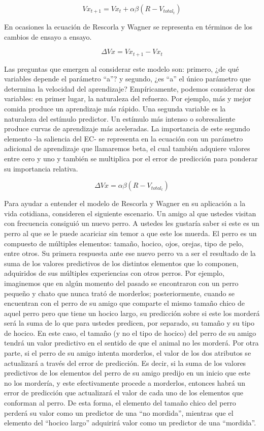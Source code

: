 \documentclass[
  letterpaper,
]{book}
\begin{document}
\[
Vx_{t+1} = Vx_t + \alpha \beta(R-V_{total_t})
\]

En ocasiones la ecuación de Rescorla y Wagner se representa en términos
de los cambios de ensayo a ensayo.

\[
\Delta Vx =Vx_{t+1} - Vx_t
\]

Las preguntas que emergen al considerar este modelo son: primero, ¿de
qué variables depende el parámetro ``a''? y segundo, ¿es ``a'' el único
parámetro que determina la velocidad del aprendizaje? Empíricamente,
podemos considerar dos variables: en primer lugar, la naturaleza del
refuerzo. Por ejemplo, más y mejor comida produce un aprendizaje más
rápido. Una segunda variable es la naturaleza del estímulo predictor. Un
estímulo más intenso o sobresaliente produce curvas de aprendizaje más
aceleradas. La importancia de este segundo elemento -la saliencia del
EC- se representa en la ecuación con un parámetro adicional de
aprendizaje que llamaremos beta, el cual también adquiere valores entre
cero y uno y también se multiplica por el error de predicción para
ponderar su importancia relativa.

\[
\Delta Vx = \alpha \beta (R-V_{total_t})
\]

Para ayudar a entender el modelo de Rescorla y Wagner en su aplicación a
la vida cotidiana, consideren el siguiente escenario. Un amigo al que
ustedes visitan con frecuencia consiguió un nuevo perro. A ustedes les
gustaría saber si este es un perro al que se le puede acariciar sin
temor a que este los muerda. El perro es un compuesto de múltiples
elementos: tamaño, hocico, ojos, orejas, tipo de pelo, entre otros. Su
primera respuesta ante ese nuevo perro va a ser el resultado de la suma
de los valores predictivos de los distintos elementos que lo componen,
adquiridos de sus múltiples experiencias con otros perros. Por ejemplo,
imaginemos que en algún momento del pasado se encontraron con un perro
pequeño y chato que nunca trató de morderlos; posteriormente, cuando se
encuentran con el perro de su amigo que comparte el mismo tamaño chico
de aquel perro pero que tiene un hocico largo, su predicción sobre si
este los morderá será la suma de lo que para ustedes predicen, por
separado, su tamaño y su tipo de hocico. En este caso, el tamaño (y no
el tipo de hocico) del perro de su amigo tendrá un valor predictivo en
el sentido de que el animal no les morderá. Por otra parte, si el perro
de su amigo intenta morderlos, el valor de los dos atributos se
actualizará a través del error de predicción. Es decir, si la suma de
los valores predictivos de los elementos del perro de su amigo predijo
en un inicio que este no los mordería, y este efectivamente procede a
morderlos, entonces habrá un error de predicción que actualizará el
valor de cada uno de los elementos que conforman al perro. De esta
forma, el elemento del tamaño chico del perro perderá su valor como un
predictor de una ``no mordida'', mientras que el elemento del ``hocico
largo'' adquirirá valor como un predictor de una ``mordida''.
\end{document}
